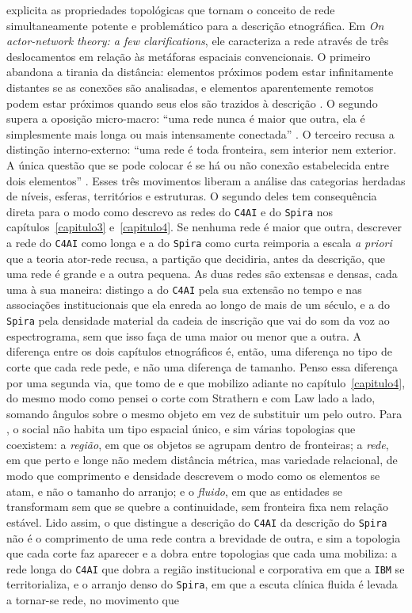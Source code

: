 \textcite{latour1996clarifications} explicita as propriedades topológicas que tornam o conceito de rede simultaneamente potente e problemático para a descrição etnográfica. Em \textit{On actor-network theory: a few clarifications}, ele caracteriza a rede através de três deslocamentos em relação às metáforas espaciais convencionais. O primeiro abandona a tirania da distância: elementos próximos podem estar infinitamente distantes se as conexões são analisadas, e elementos aparentemente remotos podem estar próximos quando seus elos são trazidos à descrição \parencite[p.~4]{latour1996clarifications}. O segundo supera a oposição micro-macro: ``uma rede nunca é maior que outra, ela é simplesmente mais longa ou mais intensamente conectada'' \parencite[p.~5]{latour1996clarifications}. O terceiro recusa a distinção interno-externo: ``uma rede é toda fronteira, sem interior nem exterior. A única questão que se pode colocar é se há ou não conexão estabelecida entre dois elementos'' \parencite[p.~6]{latour1996clarifications}. Esses três movimentos liberam a análise das categorias herdadas de níveis, esferas, territórios e estruturas. O segundo deles tem consequência direta para o modo como descrevo as redes do \texttt{C4AI} e do \texttt{Spira} nos capítulos~\ref{capitulo3} e~\ref{capitulo4}. Se nenhuma rede é maior que outra, descrever a rede do \texttt{C4AI} como longa e a do \texttt{Spira} como curta reimporia a escala \textit{a priori} que a teoria ator-rede recusa, a partição que decidiria, antes da descrição, que uma rede é grande e a outra pequena. As duas redes são extensas e densas, cada uma à sua maneira: distingo a do \texttt{C4AI} pela sua extensão no tempo e nas associações institucionais que ela enreda ao longo de mais de um século, e a do \texttt{Spira} pela densidade material da cadeia de inscrição que vai do som da voz ao espectrograma, sem que isso faça de uma maior ou menor que a outra. A diferença entre os dois capítulos etnográficos é, então, uma diferença no tipo de corte que cada rede pede, e não uma diferença de tamanho. Penso essa diferença por uma segunda via, que tomo de \textcite{MolLaw1994} e que mobilizo adiante no capítulo~\ref{capitulo4}, do mesmo modo como pensei o corte com Strathern e com Law lado a lado, somando ângulos sobre o mesmo objeto em vez de substituir um pelo outro. Para \textcite{MolLaw1994}, o social não habita um tipo espacial único, e sim várias topologias que coexistem: a \textit{região}, em que os objetos se agrupam dentro de fronteiras; a \textit{rede}, em que perto e longe não medem distância métrica, mas variedade relacional, de modo que comprimento e densidade descrevem o modo como os elementos se atam, e não o tamanho do arranjo; e o \textit{fluido}, em que as entidades se transformam sem que se quebre a continuidade, sem fronteira fixa nem relação estável. Lido assim, o que distingue a descrição do \texttt{C4AI} da descrição do \texttt{Spira} não é o comprimento de uma rede contra a brevidade de outra, e sim a topologia que cada corte faz aparecer e a dobra entre topologias que cada uma mobiliza: a rede longa do \texttt{C4AI} que dobra a região institucional e corporativa em que a \texttt{IBM} se territorializa, e o arranjo denso do \texttt{Spira}, em que a escuta clínica fluida é levada a tornar-se rede, no movimento que 